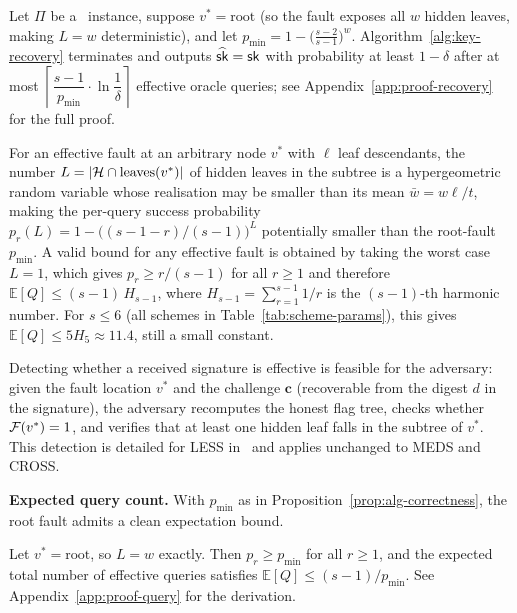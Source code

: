 \begin{proposition}
\label{prop:alg-correctness}
Let $\Pi$ be a \GZKST\ instance, suppose $v^* = \mathrm{root}$
(so the fault exposes all $w$ hidden leaves, making $L = w$ deterministic),
and let $p_{\min} = 1 - \bigl(\tfrac{s-2}{s-1}\bigr)^{\!w}$.
Algorithm~\ref{alg:key-recovery} terminates and outputs $\widehat{\mathsf{sk}} = \mathsf{sk}$
with probability at least $1 - \delta$ after at most
$\left\lceil \dfrac{s-1}{p_{\min}} \cdot \ln\!\dfrac{1}{\delta} \right\rceil$
effective oracle queries; see Appendix~\ref{app:proof-recovery} for the full proof.
\end{proposition}

\begin{remark}
\label{rem:general-fault}
For an effective fault at an arbitrary node $v^*$ with $\ell$ leaf
descendants, the number $L = |\mathcal{H} \cap \mathrm{leaves}(v^*)|$ of hidden
leaves in the subtree is a hypergeometric random variable whose realisation
may be smaller than its mean $\bar{w} = w\ell/t$, making the per-query
success probability $p_r(L) = 1-\bigl((s{-}1{-}r)/(s{-}1)\bigr)^{\!L}$
potentially smaller than the root-fault $p_{\min}$.  A valid bound for any
effective fault is obtained by taking the worst case $L = 1$, which gives
$p_r \geq r/(s-1)$ for all $r \geq 1$ and therefore
$\mathbb{E}[Q] \leq (s-1)\,H_{s-1}$,
where $H_{s-1} = \sum_{r=1}^{s-1}1/r$ is the $(s{-}1)$-th harmonic number.
For $s \leq 6$ (all schemes in Table~\ref{tab:scheme-params}), this gives
$\mathbb{E}[Q] \leq 5H_5 \approx 11.4$, still a small constant.
\end{remark}

\noindent
Detecting whether a received signature is effective is feasible for
the adversary: given the fault location $v^*$ and the challenge $\mathbf{c}$
(recoverable from the digest $d$ in the signature), the adversary recomputes
the honest flag tree, checks whether $\mathcal{F}(v^*) = 1$, and verifies that at
least one hidden leaf falls in the subtree of $v^*$.
This detection is detailed for LESS in~\cite{ZKFault} and applies
unchanged to MEDS and CROSS.

\noindent\textbf{Expected query count.}
With $p_{\min}$ as in Proposition~\ref{prop:alg-correctness}, the root fault
admits a clean expectation bound.

\begin{proposition}
\label{prop:query-count}
Let $v^* = \mathrm{root}$, so $L = w$ exactly. Then $p_r \geq p_{\min}$ for all
$r \geq 1$, and the expected total number of effective queries satisfies
$\mathbb{E}[Q] \leq (s-1)/p_{\min}$.
See Appendix~\ref{app:proof-query} for the derivation.
\end{proposition}

